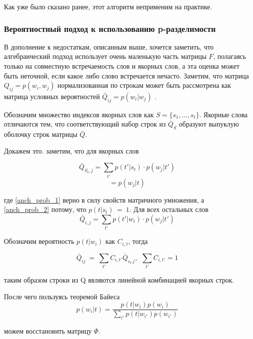 \documentclass[a4paper, 14pt]{extarticle}
\begin{document}
Как уже было сказано ранее, этот алгоритм неприменим на практике.
\subsubsection*{Вероятностный подход к использованию p-разделимости}
В дополнение к недостаткам, описанным выше, хочется заметить, что алгебраический подход использует очень маленькую часть матрицы $F$, полагаясь только на совместную встречаемость  слов и якорных слов, а эта оценка может быть неточной, если какое либо слово встречается нечасто.
Заметим, что матрица $Q_{ij} = p(w_i, w_j)$ нормализованная по строкам может быть рассмотрена как матрица условных вероятностей $\bar{Q}_{ij} = p(w_i| w_j)$ \cite{Arora12b}. 

Обозначим множество индексов якорных слов как $S = \{s_1, \dots, s_t\}$. Якорные слова отличаются тем, что соответствующий набор строк из $\bar{Q}_{S}$ образуют выпуклую оболочку строк матрицы $\bar{Q}$.

Докажем это. заметим, что для якорных слов

\begin{equation}
	\bar{Q}_{S_t, j} = \sum_{t'} p(t'|s_t)\cdot p(w_j|t') 
	\label{anch_prob_1}
\end{equation}
\begin{equation}
	= p(w_j|t)
	\label{anch_prob_2}
\end{equation}

где \ref{anch_prob_1} верно в силу свойств матричного умножения, а \ref{anch_prob_2} потому, что $p(t| s_t)~=~1$. Для всех остальных слов
\begin{equation}
	\bar{Q}_{i, j} = \sum_{t'} p(t'| w_i)\cdot p(w_j| t') 
	\label{anch_prob_3}
\end{equation}

Обозначим вероятность $p(t| w_i)$ как $C_{i,t}$, тогда 

\begin{equation}
	\bar{Q}_{ij}~=~\sum_{t'} C_{i, t'} \bar{Q}_{s_{t'}j},~~\sum_{t'}C_{i, t'} = 1 	
\end{equation}

таким образом строки из Q являются линейной комбинацией якорных строк.

После чего пользуясь теоремой Байеса
\begin{equation}
p(w_i| t) = \frac{p(t| w_i)p(w_i)}{\sum_{i'} p(t| w_{i'})p(w_{i'})}
\end{equation}

можем восстановить матрицу $\Phi$.
\end{document}
